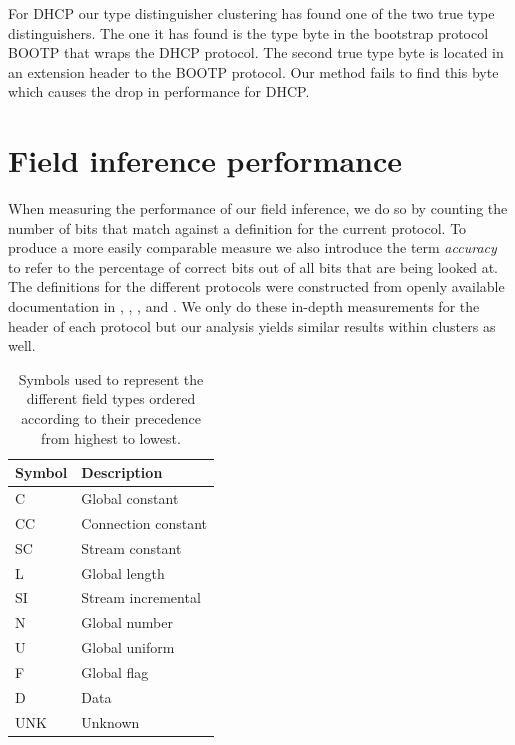 \documentclass[a4paper]{report}
\begin{document}
For DHCP our type distinguisher clustering has found one of the two true
type distinguishers. The one it has found is the type byte in the
bootstrap protocol BOOTP that wraps the DHCP protocol. The second true type
byte is located in an extension header to the BOOTP protocol. Our method fails
to find this byte which causes the drop in performance for DHCP.

\section{Field inference performance}
\label{sec:fieldperf}
%
When measuring the performance of our field inference, we do so by counting the
number of bits that match against a definition for the current protocol. To
produce a more easily comparable measure we also introduce the term
\emph{accuracy} to refer to the percentage of correct bits out of all bits that
are being looked at. The definitions for the different protocols were
constructed from openly available documentation in ,
, , 
and . We only do these in-depth measurements for the
header of each protocol but our analysis yields similar results within clusters
as well.

\begin{table}[h]
    \centering
    \captionsetup{width=0.8\textwidth}
    \caption{Symbols used to represent the different field types ordered
    according to their precedence from highest to lowest.}
    \begin{tabular}{| l | l |}
        \hline
        \textbf{Symbol}&\textbf{Description} \\ \hline
        C   & Global constant \\ \hline
        CC  & Connection constant \\ \hline
        SC  & Stream constant \\ \hline
        L   & Global length \\ \hline
        SI  & Stream incremental \\ \hline
        N   & Global number \\ \hline
        U   & Global uniform \\ \hline
        F   & Global flag \\ \hline
        D   & Data \\ \hline
        UNK & Unknown \\ \hline
    \end{tabular}
    \label{tab:symbols}
\end{table}
\end{document}
